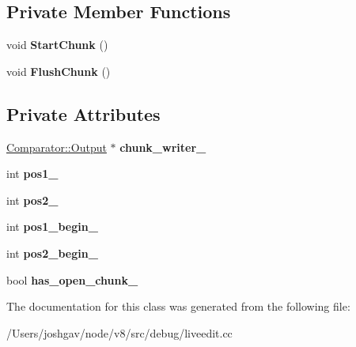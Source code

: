 \subsection*{Private Member Functions}
\begin{DoxyCompactItemize}
\item 
void {\bfseries Start\+Chunk} ()\hypertarget{classv8_1_1internal_1_1_differencer_1_1_result_writer_aac8e3b6e918cffc7fe41829b22e1cdf0}{}\label{classv8_1_1internal_1_1_differencer_1_1_result_writer_aac8e3b6e918cffc7fe41829b22e1cdf0}

\item 
void {\bfseries Flush\+Chunk} ()\hypertarget{classv8_1_1internal_1_1_differencer_1_1_result_writer_a40f76093cbb44cfea6abb85f7aec5d2b}{}\label{classv8_1_1internal_1_1_differencer_1_1_result_writer_a40f76093cbb44cfea6abb85f7aec5d2b}

\end{DoxyCompactItemize}
\subsection*{Private Attributes}
\begin{DoxyCompactItemize}
\item 
\hyperlink{classv8_1_1internal_1_1_comparator_1_1_output}{Comparator\+::\+Output} $\ast$ {\bfseries chunk\+\_\+writer\+\_\+}\hypertarget{classv8_1_1internal_1_1_differencer_1_1_result_writer_a8c479c0392906fd4675b8eefaf358a6b}{}\label{classv8_1_1internal_1_1_differencer_1_1_result_writer_a8c479c0392906fd4675b8eefaf358a6b}

\item 
int {\bfseries pos1\+\_\+}\hypertarget{classv8_1_1internal_1_1_differencer_1_1_result_writer_aaf4d0ce16f427c26e11fde5d3be65b39}{}\label{classv8_1_1internal_1_1_differencer_1_1_result_writer_aaf4d0ce16f427c26e11fde5d3be65b39}

\item 
int {\bfseries pos2\+\_\+}\hypertarget{classv8_1_1internal_1_1_differencer_1_1_result_writer_a67c9e09b3b28b5eb375e7e688d49b962}{}\label{classv8_1_1internal_1_1_differencer_1_1_result_writer_a67c9e09b3b28b5eb375e7e688d49b962}

\item 
int {\bfseries pos1\+\_\+begin\+\_\+}\hypertarget{classv8_1_1internal_1_1_differencer_1_1_result_writer_a600c6e4c0d6451fbc823ef2cda8bec8c}{}\label{classv8_1_1internal_1_1_differencer_1_1_result_writer_a600c6e4c0d6451fbc823ef2cda8bec8c}

\item 
int {\bfseries pos2\+\_\+begin\+\_\+}\hypertarget{classv8_1_1internal_1_1_differencer_1_1_result_writer_a4ee4272129ecbb07e2738cfd53c8e96e}{}\label{classv8_1_1internal_1_1_differencer_1_1_result_writer_a4ee4272129ecbb07e2738cfd53c8e96e}

\item 
bool {\bfseries has\+\_\+open\+\_\+chunk\+\_\+}\hypertarget{classv8_1_1internal_1_1_differencer_1_1_result_writer_ae4088b8a21cd67a57ef9f59032352d64}{}\label{classv8_1_1internal_1_1_differencer_1_1_result_writer_ae4088b8a21cd67a57ef9f59032352d64}

\end{DoxyCompactItemize}


The documentation for this class was generated from the following file\+:\begin{DoxyCompactItemize}
\item 
/\+Users/joshgav/node/v8/src/debug/liveedit.\+cc\end{DoxyCompactItemize}
